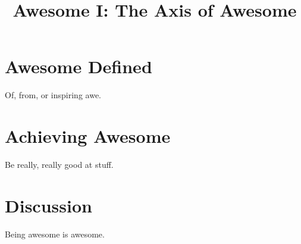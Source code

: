 \documentclass{article}
\begin{document}
\title{Awesome I: The Axis of Awesome}

\section{Awesome Defined}

Of, from, or inspiring awe.

\section{Achieving Awesome}

Be really, really good at stuff.

\section{Discussion}

Being awesome is awesome.
\end{document}
